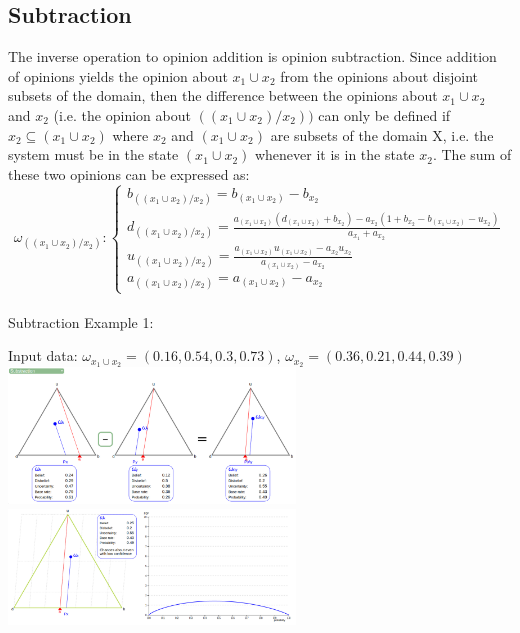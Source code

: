 \documentclass[UTF8]{article}
\newcommand{\opinion}[5]{$\omega_{#1} = (#2, #3, #4, #5)$}
\begin{document}
\subsection{Subtraction}
The inverse operation to opinion addition is opinion subtraction. Since addition
of opinions yields the opinion about $x_1 \cup x_2$ from the opinions about disjoint subsets
of the domain, then the difference between the opinions about $x_1 \cup x_2$ and $x_2$ (i.e.
the opinion about $((x_1 \cup x_2)/x_2))$ can only be defined if $x_2 \subseteq (x_1 \cup x_2)$ where $x_2$ and
$(x_1 \cup x_2)$ are subsets of the domain X, i.e. the system must be in the state $(x_1 \cup x_2)$
whenever it is in the state $x_2$. The sum of these two opinions can be expressed as:
$$
\omega_{((x_1 \cup x_2)/x_2)}: 
\begin{cases}
    b_{((x_1 \cup x_2)/x_2)} = b_{(x_1 \cup x_2)} - b_{x_2}\\    
    d_{((x_1 \cup x_2)/x_2)} = \frac{a_{(x_1 \cup x_2)}(d_{(x_1 \cup x_2)} + b_{x_2}) - a_{x_2}(1 + b_{x_2} - b_{(x_1 \cup x_2)} - u_{x_2})}{a_{x_1} + a_{x_2}}\\
    u_{((x_1 \cup x_2)/x_2)} = \frac{a_{(x_1 \cup x_2)} u_{(x_1 \cup x_2)} - a_{x_2} u_{x_2}}{a_{(x_1 \cup x_2)} - a_{x_2}}\\
    a_{((x_1 \cup x_2)/x_2)} = a_{(x_1 \cup x_2)} - a_{x_2}
\end{cases}
$$\\
Subtraction Example 1:\\
\begin{center}
    Input data: 
    \opinion{x_1 \cup x_2}{0.16}{0.54}{0.3}{0.73}, 
    \opinion{x_2}{0.36}{0.21}{0.44}{0.39}\\
    \includegraphics[width=3in]{images/sub1.png}
    \includegraphics[width=3in]{images/sub1viz.png}
\end{center}
\end{document}
